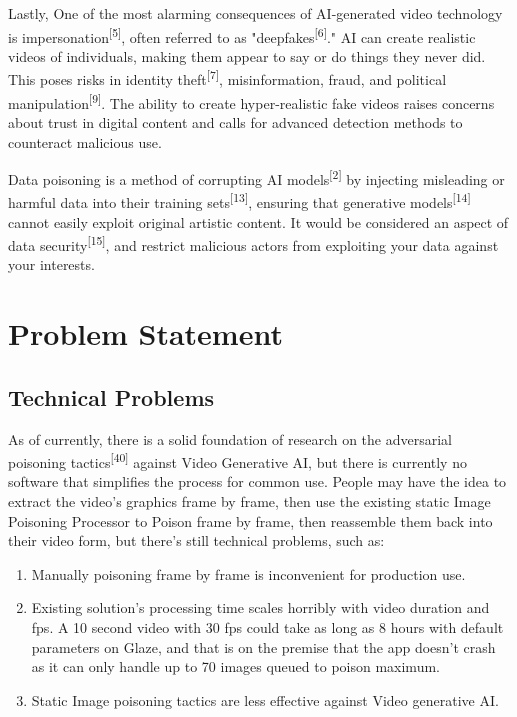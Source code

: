 Lastly, One of the most alarming consequences of AI-generated video technology is impersonation\textsuperscript{[5]}, often referred to as "deepfakes\textsuperscript{[6]}." AI can create realistic videos of individuals, making them appear to say or do things they never did. This poses risks in identity theft\textsuperscript{[7]}, misinformation, fraud, and political manipulation\textsuperscript{[9]}. The ability to create hyper-realistic fake videos raises concerns about trust in digital content and calls for advanced detection methods to counteract malicious use.

Data poisoning is a method of corrupting AI models\textsuperscript{[2]} by injecting misleading or harmful data into their training sets\textsuperscript{[13]}, ensuring that generative models\textsuperscript{[14]} cannot easily exploit original artistic content. It would be considered an aspect of data security\textsuperscript{[15]}, and restrict malicious actors from exploiting your data against your interests.

\section{Problem Statement}
\label{section:problem-statement}

\subsection{Technical Problems}
\label{subsection:Technical-Problems}

As of currently, there is a solid foundation of research on the adversarial poisoning tactics\textsuperscript{[40]} against Video Generative AI, but there is currently no software that simplifies the process for common use. People may have the idea to extract the video’s graphics frame by frame, then use the existing static Image Poisoning Processor to Poison frame by frame, then reassemble them back into their video form, but there’s still technical problems, such as:

\begin{enumerate}
        \item Manually poisoning frame by frame is inconvenient for production use.
        \item Existing solution’s processing time scales horribly with video duration and fps. A 10 second video with 30 fps could take as long as 8 hours with default parameters on Glaze, and that is on the premise that the app doesn’t crash as it can only handle up to 70 images queued to poison maximum.
        \item Static Image poisoning tactics are less effective against Video generative AI.
\end{enumerate}

